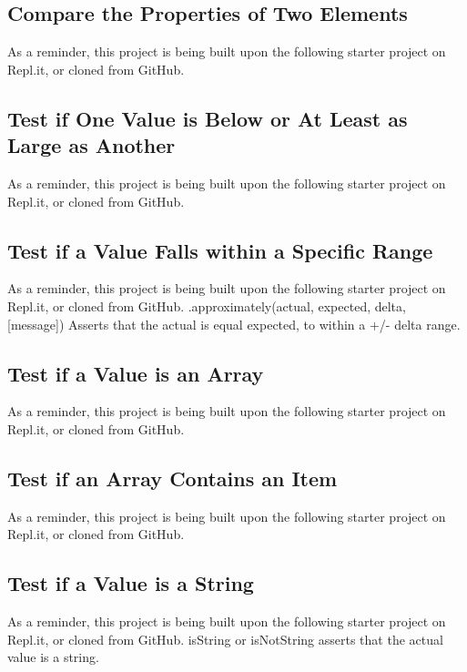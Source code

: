 \documentclass{article}%
\begin{document}
%
\subsection{Compare the Properties of Two Elements}%
\label{subsec:ComparethePropertiesofTwoElements}%
As a reminder, this project is being built upon the following starter project on Repl.it, or cloned from GitHub.\newline%

%
\subsection{Test if One Value is Below or At Least as Large as Another}%
\label{subsec:TestifOneValueisBeloworAtLeastasLargeasAnother}%
As a reminder, this project is being built upon the following starter project on Repl.it, or cloned from GitHub.\newline%

%
\subsection{Test if a Value Falls within a Specific Range}%
\label{subsec:TestifaValueFallswithinaSpecificRange}%
As a reminder, this project is being built upon the following starter project on Repl.it, or cloned from GitHub.\newline%
.approximately(actual, expected, delta, {[}message{]})\newline%
Asserts that the actual is equal expected, to within a +/{-} delta range.\newline%

%
\subsection{Test if a Value is an Array}%
\label{subsec:TestifaValueisanArray}%
As a reminder, this project is being built upon the following starter project on Repl.it, or cloned from GitHub.\newline%

%
\subsection{Test if an Array Contains an Item}%
\label{subsec:TestifanArrayContainsanItem}%
As a reminder, this project is being built upon the following starter project on Repl.it, or cloned from GitHub.\newline%

%
\subsection{Test if a Value is a String}%
\label{subsec:TestifaValueisaString}%
As a reminder, this project is being built upon the following starter project on Repl.it, or cloned from GitHub.\newline%
isString or isNotString asserts that the actual value is a string.\newline%
\end{document}

